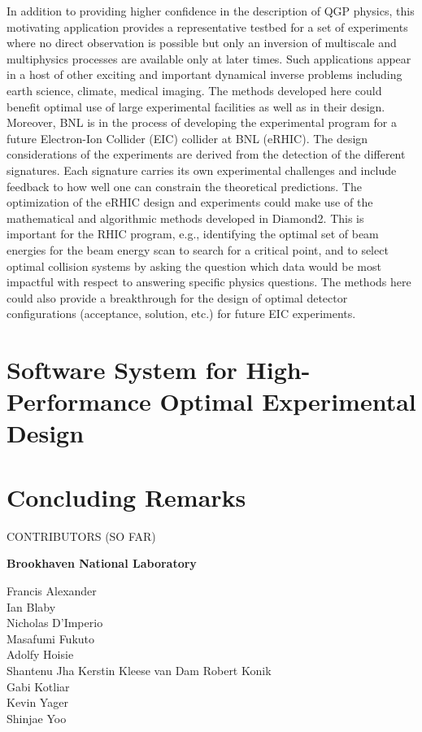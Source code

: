 \documentclass[11pt]{article}
\begin{document}
 In addition to providing higher confidence in the
description of QGP physics, this motivating application provides a
representative testbed for a set of experiments where no direct
observation is possible but only an inversion of multiscale and
multiphysics processes are available only at later times.  Such
applications appear in a host of other exciting and important
dynamical inverse problems including earth science, climate, medical
imaging. The methods developed here could benefit optimal use of large
experimental facilities as well as in their design.  Moreover, BNL is
in the process of developing the experimental program for a future
Electron-Ion Collider (EIC) collider at BNL (eRHIC). The design
considerations of the experiments are derived from the detection of
the different signatures. Each signature carries its own experimental
challenges and include feedback to how well one can constrain the
theoretical predictions.  The optimization of the eRHIC design and
experiments could make use of the mathematical and algorithmic methods
developed in Diamond2.  This is important for the RHIC program, e.g.,
identifying the optimal set of beam energies for the beam energy scan
to search for a critical point, and to select optimal collision
systems by asking the question which data would be most impactful with
respect to answering specific physics questions.  The methods here
could also provide a breakthrough for the design of optimal detector
configurations (acceptance, solution, etc.) for future EIC
experiments.




\section{Software System for High-Performance Optimal Experimental Design}

\section{Concluding Remarks}

\newpage



\begin{center}
CONTRIBUTORS (SO FAR)
\end{center}

\bf{Brookhaven National Laboratory}

Francis Alexander \\
Ian Blaby\\
Nicholas D'Imperio\\
Masafumi Fukuto\\
Adolfy Hoisie\\
Shantenu Jha
Kerstin Kleese van Dam
Robert Konik\\
Gabi Kotliar\\
Kevin Yager\\
Shinjae Yoo\\
 
\end{document}
